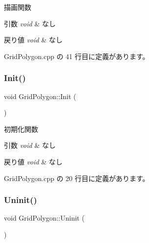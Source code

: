 描画関数 


\begin{DoxyParams}{引数}
{\em void} & なし \\
\hline
\end{DoxyParams}

\begin{DoxyRetVals}{戻り値}
{\em void} & なし \\
\hline
\end{DoxyRetVals}


 Grid\+Polygon.\+cpp の 41 行目に定義があります。

\mbox{\label{class_grid_polygon_a6184f3ce67a389e61ab111c5504d79a0}} 
\subsubsection{\texorpdfstring{Init()}{Init()}}
{\footnotesize\ttfamily void Grid\+Polygon\+::\+Init (\begin{DoxyParamCaption}{ }\end{DoxyParamCaption})}



初期化関数 


\begin{DoxyParams}{引数}
{\em void} & なし \\
\hline
\end{DoxyParams}

\begin{DoxyRetVals}{戻り値}
{\em void} & なし \\
\hline
\end{DoxyRetVals}


 Grid\+Polygon.\+cpp の 20 行目に定義があります。

\mbox{\label{class_grid_polygon_a85a4aa71aba9297e3bf90bd6f409b6f6}} 
\subsubsection{\texorpdfstring{Uninit()}{Uninit()}}
{\footnotesize\ttfamily void Grid\+Polygon\+::\+Uninit (\begin{DoxyParamCaption}{ }\end{DoxyParamCaption})}



